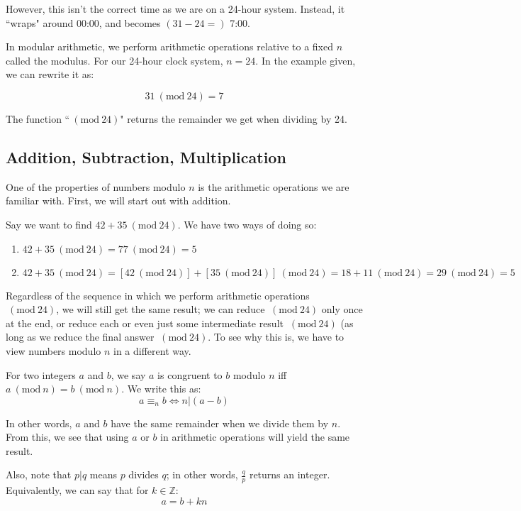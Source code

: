 \documentclass[openany]{book}
\newcommand{\Mod}[1]{\ (\mathrm{mod}\ #1)}
\begin{document}
However, this isn't the correct time as we are on a 24-hour system. Instead, it ``wraps" around 00:00, and becomes $(31-24=)$ 7:00.

In modular arithmetic, we perform arithmetic operations relative to a fixed $n$ called the modulus. For our 24-hour clock system, $n=24$. In the example given, we can rewrite it as:

\begin{equation*}
	31\Mod{24}=7
\end{equation*}

The function ``$\Mod{24}$" returns the remainder we get when dividing by 24.

\subsection{Addition, Subtraction, Multiplication}
One of the properties of numbers modulo $n$ is the arithmetic operations we are familiar with. First, we will start out with addition.

Say we want to find $42+35\Mod{24}$. We have two ways of doing so:
\begin{enumerate}
	\item $42+35\Mod{24}=77\Mod{24}=5$
	\item $42+35\Mod{24}=[42\Mod{24}]+[35\Mod{24}]\Mod{24}=18+11\Mod{24}=29\Mod{24}=5$
\end{enumerate}

Regardless of the sequence in which we perform arithmetic operations $\Mod{24}$, we will still get the same result; we can reduce $\Mod{24}$ only once at the end, or reduce each or even just some intermediate result $\Mod{24}$ (as long as we reduce the final answer $\Mod{24}$. To see why this is, we have to view numbers modulo $n$ in a different way.

For two integers $a$ and $b$, we say $a$ is congruent to $b$ modulo $n$ iff $a\Mod{n}=b\Mod{n}$. We write this as:
\begin{equation*}
	a\equiv_nb\iff n|(a-b)
\end{equation*}

In other words, $a$ and $b$ have the same remainder when we divide them by $n$. From this, we see that using $a$ or $b$ in arithmetic operations will yield the same result.

Also, note that $p|q$ means $p$ divides $q$; in other words, $\frac{q}{p}$ returns an integer. Equivalently, we can say that for $k\in\mathbb{Z}$:
\begin{equation*}
	a=b+kn
\end{equation*}
\end{document}
